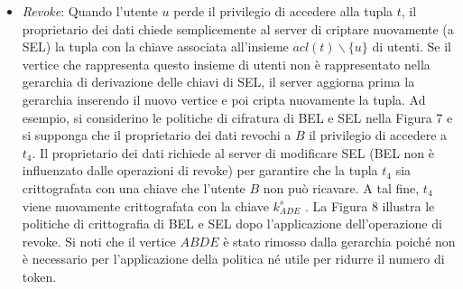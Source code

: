 \begin{itemize}
    \item \textit{Revoke}: Quando l'utente $u$ perde il privilegio di accedere alla tupla $t$, il proprietario dei dati chiede semplicemente al server di criptare nuovamente (a SEL) la tupla con la chiave associata all'insieme $acl(t)\backslash\{u\}$ di utenti. Se il vertice che rappresenta questo insieme di utenti non è rappresentato nella gerarchia di derivazione delle chiavi di SEL, il server aggiorna prima la gerarchia inserendo il nuovo vertice e poi cripta nuovamente la tupla. Ad esempio, si considerino le politiche di cifratura di BEL e SEL nella Figura 7 e si supponga che il proprietario dei dati revochi a $B$ il privilegio di accedere a $t_4$. Il proprietario dei dati richiede al server di modificare SEL (BEL non è influenzato dalle operazioni di revoke) per garantire che la tupla $t_4$ sia crittografata con una chiave che l'utente $B$ non può ricavare. A tal fine, $t_4$ viene nuovamente crittografata con la chiave $k^s_{ADE}$ . La Figura 8 illustra le politiche di crittografia di BEL e SEL dopo l'applicazione dell'operazione di revoke. Si noti che il vertice $ABDE$ è stato rimosso dalla gerarchia poiché non è necessario per l'applicazione della politica né utile per ridurre il numero di token.
\end{itemize}

